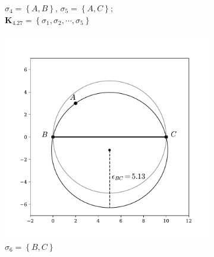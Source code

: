 \begin{figure}[tb]
\begin{subfigure}[b]{0.45\textwidth}
        \caption{$\sigma_4=\left\{A,B\right\}$, $\sigma_5=\left\{A,C\right\}$; \\ $\mathbf{K}_{4.27} = \left\{\sigma_1,\sigma_2,\cdots,\sigma_5\right\}$}
         \label{fig:phalphab1}
     \end{subfigure}
     \hfill
        
      \vspace{0.5cm}
      \begin{subfigure}[b]{0.45\textwidth}
         \centering
         \includegraphics[width=\textwidth]{./figures/ph/alpha_b1.pdf}
         \caption{$\sigma_6=\left\{B,C\right\}$ \\ \phantom{x}}
         \label{fig:phalphab2}
     \end{subfigure}
     \hfill
      \begin{subfigure}[b]{0.45\textwidth}
         \centering

\end{subfigure}
\end{figure}
